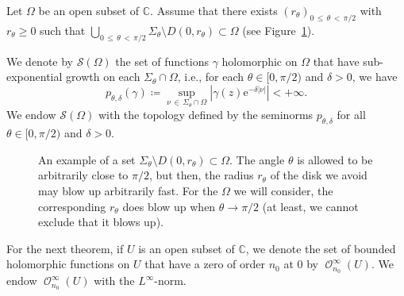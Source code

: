 \documentclass[AHL,Unicode,longabstracts,published]{cedram}
\renewcommand{\leq}{\leqslant}
\renewcommand{\geq}{\geqslant}
\newcommand{\1}{\mathds 1}
\DeclareMathOperator{\Hol}{\mathcal O}
\newcommand{\C}{\mathbb{C}}
\newcommand{\Sc}{{\mathcal S}}
\newcommand{\eu}{\mathrm e}
\newcommand{\sector}[1][\theta_0]{\Sigma_{#1}}
\renewcommand{\d}{\delta}
\renewcommand{\th}{\theta}
\begin{document}
\begin{defi}\label{def-symbols}
Let $\Omega$ be an open subset of $\C$. Assume that there exists $(r_\th)_{0\,\leq\,\th\,<\,\pi/2}$ with $r_\th \geq 0$ such that $\bigcup_{0\,\leq\,\th\,<\,\pi/2}\sector[\th]\setminus D(0,r_\th) \subset \Omega$ (see Figure~\ref{fig:U_r_theta}).

We denote by $\Sc(\Omega)$ the set of functions $\gamma$ holomorphic on $\Omega$ that have sub-exponential growth on each $\sector[\th]\cap \Omega$, i.e., for each $\theta\in [0,\pi/2)$ and $\d>0$, we have
\[
p_{\theta,\d}(\gamma) \coloneqq \sup_{\nu\,\in\,\sector[\th] \cap \Omega} \left|\gamma(z)\eu^{-\d|\nu|}\right| < +\infty.
\]
We endow $\Sc(\Omega)$ with the topology defined by the seminorms $p_{\theta,\d}$ for all $\theta\in[0,\pi/2)$ and $\d>0$.
\end{defi}

\begin{figure}[ht]
\begin{center}
\end{center}
\caption{An example of a set $\sector[\th]\setminus D(0,r_\th) \subset \Omega$. The angle $\theta$ is allowed to be arbitrarily close to $\pi/2$, but then, the radius $r_\theta$ of the disk we avoid may blow up arbitrarily fast. For the $\Omega$ we will consider, the corresponding $r_\theta$ does blow up when $\theta \to \pi/2$ (at least, we cannot exclude that it blows up).}\label{fig:U_r_theta}
\end{figure}

For the next theorem, if $U$ is an open subset of $\C$, we denote the set of bounded holomorphic functions on $U$ that have a zero of order $n_0$ at $0$ by $\Hol^\infty_{n_0}(U)$. We endow $\Hol^\infty_{n_0}(U)$ with the $L^\infty$-norm.
\end{document}
